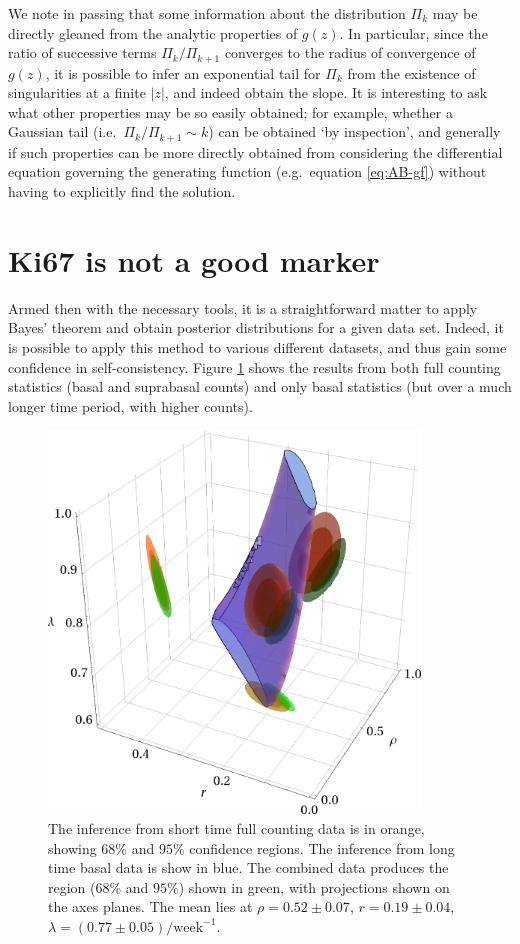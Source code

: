 \documentclass[10pt,english]{report}
\begin{document}
We note in passing that some information about the distribution $\Pi_k$ may be directly gleaned from the analytic properties of $g(z)$. In particular, since the ratio of successive terms $\Pi_{k} / \Pi_{k+1}$ converges to the radius of convergence of $g(z)$, it is possible to infer an exponential tail for $\Pi_k$ from the existence of singularities at a finite $\left| z \right|$, and indeed obtain the slope. It is interesting to ask what other properties may be so easily obtained; for example, whether a Gaussian tail (i.e.\ $\Pi_{k} / \Pi_{k+1} \sim k$) can be obtained `by inspection', and generally if such properties can be more directly obtained from considering the differential equation governing the generating function (e.g.\ equation \eqref{eq:AB-gf}) without having to explicitly find the solution.

\section{\label{sec:ki67}Ki67 is not a good marker}

Armed then with the necessary tools, it is a straightforward matter to apply Bayes' theorem and obtain posterior distributions for a given data set. Indeed, it is possible to apply this method to various different datasets, and thus gain some confidence in self-consistency. Figure \ref{fig:oes-inference-result} shows the results from both full counting statistics (basal and suprabasal counts) and only basal statistics (but over a much longer time period, with higher counts).

\begin{figure}[htb]
	\centering
	\includegraphics[height=4in]{oes-combined-prior.png}
	\caption{\label{fig:oes-inference-result}The inference from short time full counting data is in orange, showing $68\%$ and $95\%$ confidence regions. The inference from long time basal data is show in blue. The combined data produces the region (68\% and $95\%$) shown in green, with projections shown on the axes planes. The mean lies at $\rho = 0.52 \pm 0.07$, $r = 0.19 \pm 0.04$, $\lambda = (0.77 \pm 0.05) /\textrm{week}^{-1}$.}
\end{figure}
\end{document}
